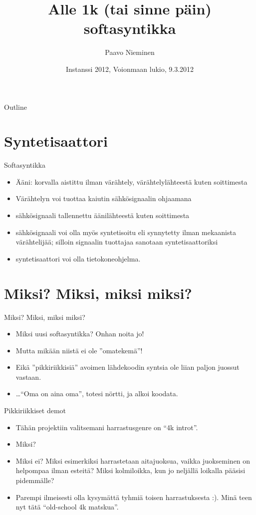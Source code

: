 \documentclass{beamer}
\title%
{Alle 1k (tai sinne päin) softasyntikka}
\author{Paavo Nieminen}
\date{Instanssi 2012, Voionmaan lukio, 9.3.2012}
\begin{document}
\begin{frame}
  \titlepage
\end{frame}

\begin{frame}{Outline}
  \tableofcontents
\end{frame}

\section{Syntetisaattori}

\begin{frame}{Softasyntikka}
\begin{itemize}
  \item Ääni: korvalla aistittu ilman värähtely, värähtelylähteestä
    kuten soittimesta
  \item Värähtelyn voi tuottaa kaiutin sähkösignaalin ohjaamana
  \item sähkösignaali tallennettu äänilähteestä kuten soittimesta
  \item sähkösignaali voi olla myös syntetisoitu eli synnytetty ilman
    mekaanista värähtelijää; silloin signaalin tuottajaa sanotaan
    syntetisaattoriksi
  \item syntetisaattori voi olla tietokoneohjelma.
\end{itemize}
\end{frame}

\section{Miksi? Miksi, miksi miksi?}
\begin{frame}{Miksi? Miksi, miksi miksi?}
  \begin{itemize}
  \item Miksi uusi softasyntikka? Onhan noita jo!
  \item Mutta mikään niistä ei ole ''omatekemä''!
  \item Eikä ''pikkiriikkisiä'' avoimen lähdekoodin syntsia ole liian
    paljon juossut vastaan.
  \item \ldots ``Oma on aina oma'', totesi nörtti, ja alkoi koodata.
  \end{itemize}
\end{frame}


\begin{frame}{Pikkiriikkiset demot}
\begin{itemize}
  \item Tähän projektiin valitsemani harrastusgenre on ``4k introt''.
  \item Miksi?
  \item Miksi ei? Miksi esimerkiksi harrastetaan aitajuoksua, vaikka
    juokseminen on helpompaa ilman esteitä? Miksi kolmiloikka, kun jo
    neljällä loikalla pääsisi pidemmälle?
  \item Parempi ilmeisesti olla kysymättä tyhmiä toisen harrastuksesta
    :). Minä teen nyt tätä ``old-school 4k matskua''.
\end{itemize}
\end{frame}
\end{document}
